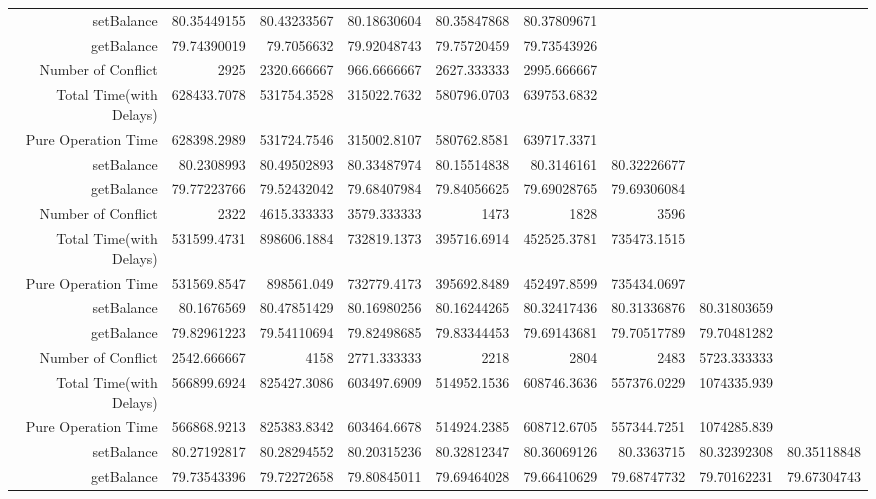 \begin{landscape}
\begin{table}[htbp]
\begin{tabular}{rrrrrrrrr}
    \cline{1-9}
    setBalance & 80.35449155 & 80.43233567 & 80.18630604 & 80.35847868 & 80.37809671 &       &       &  \\
    getBalance & 79.74390019 & 79.7056632 & 79.92048743 & 79.75720459 & 79.73543926 &       &       &  \\
    Number of Conflict & 2925  & 2320.666667 & 966.6666667 & 2627.333333 & 2995.666667 &       &       &  \\
    Total Time(with Delays) & 628433.7078 & 531754.3528 & 315022.7632 & 580796.0703 & 639753.6832 &       &       &  \\
    Pure Operation Time & 628398.2989 & 531724.7546 & 315002.8107 & 580762.8581 & 639717.3371 &       &       &  \\
    \cline{1-9}
    setBalance & 80.2308993 & 80.49502893 & 80.33487974 & 80.15514838 & 80.3146161 & 80.32226677 &       &  \\
    getBalance & 79.77223766 & 79.52432042 & 79.68407984 & 79.84056625 & 79.69028765 & 79.69306084 &       &  \\
    Number of Conflict & 2322  & 4615.333333 & 3579.333333 & 1473  & 1828  & 3596  &       &  \\
    Total Time(with Delays) & 531599.4731 & 898606.1884 & 732819.1373 & 395716.6914 & 452525.3781 & 735473.1515 &       &  \\
    Pure Operation Time & 531569.8547 & 898561.049 & 732779.4173 & 395692.8489 & 452497.8599 & 735434.0697 &       &  \\
    \cline{1-9}
    setBalance & 80.1676569 & 80.47851429 & 80.16980256 & 80.16244265 & 80.32417436 & 80.31336876 & 80.31803659 &  \\
    getBalance & 79.82961223 & 79.54110694 & 79.82498685 & 79.83344453 & 79.69143681 & 79.70517789 & 79.70481282 &  \\
    Number of Conflict & 2542.666667 & 4158  & 2771.333333 & 2218  & 2804  & 2483  & 5723.333333 &  \\
    Total Time(with Delays) & 566899.6924 & 825427.3086 & 603497.6909 & 514952.1536 & 608746.3636 & 557376.0229 & 1074335.939 &  \\    
    Pure Operation Time & 566868.9213 & 825383.8342 & 603464.6678 & 514924.2385 & 608712.6705 & 557344.7251 & 1074285.839 &  \\
    \cline{1-9}
    setBalance & 80.27192817 & 80.28294552 & 80.20315236 & 80.32812347 & 80.36069126 & 80.3363715 & 80.32392308 & 80.35118848 \\
    getBalance & 79.73543396 & 79.72272658 & 79.80845011 & 79.69464028 & 79.66410629 & 79.68747732 & 79.70162231 & 79.67304743 \\

\end{tabular}
\end{table}
\end{landscape}
